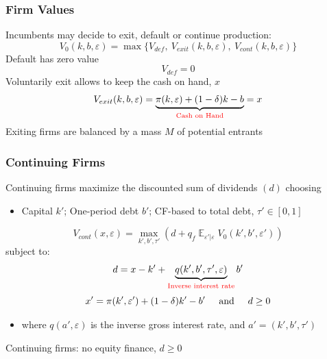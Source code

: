 \documentclass[aspectratio=169,xcolor=table]{beamer}
\DeclareMathOperator{\E}{\mathbb{E}}
\providecommand{\E}{\mathbb{E}}
\begin{document}
\begin{frame}[label=Firmvalues] \frametitle{Firm Values}

Incumbents may decide to exit, default or continue production: 
\begin{equation*} \label{eq:default decision}
    V_0(k,b,\varepsilon) = \max \{V_{def}, \  V_{exit}(k,b,\varepsilon),  \ V_{cont}(k,b,\varepsilon) \}
\end{equation*}
Default has zero value
$$ V_{def} = 0 $$ 
Voluntarily exit allows to keep the cash on hand, $x$ 
 $$    V_{exit}(k, b, \varepsilon) =  \underbrace{\pi(k,\varepsilon) + (1-\delta)k - b}_{\textcolor{red}{\text{Cash on Hand}}}  = x $$
Exiting firms are balanced by a mass $M$ of potential entrants \hfill \hyperlink{Entrants}{}
\end{frame}

\begin{frame}[label= ContFirms] \frametitle{Continuing Firms \hfill\hyperlink{Model Summary}{}}

Continuing firms maximize the discounted sum of dividends $(d)$ choosing
\begin{itemize} \small
    \item Capital $k'$; One-period debt $b'$; CF-based to total debt, $\tau' \in [0,1]$
\end{itemize} \normalsize


\begin{equation*} \label{eq:V_cont}
    V_{cont}(x,\varepsilon) = \max_{k',b', \tau'} \left( d + q_f \E_{\varepsilon'|\varepsilon} V_0(k',b', \varepsilon') \right)
\end{equation*}
subject to: 
$$ d = x - k' +  \underbrace{q(k',b',\tau', \varepsilon)}_{\textcolor{red}{\text{Inverse interest rate}}} b' $$
\begin{equation*} \label{eq:budget}
x' = \pi(k',\varepsilon')+(1-\delta)k'-b' \hspace{5mm} \text{and} \hspace{5mm} d \geq 0
\end{equation*} 

\begin{itemize} \small
    \item where $q(a',\varepsilon) $ is the inverse gross interest rate, and $a' = (k',b',\tau')$
\end{itemize} \normalsize
Continuing firms: no equity finance, $d \geq 0$ 
  
\end{frame}
\end{document}
